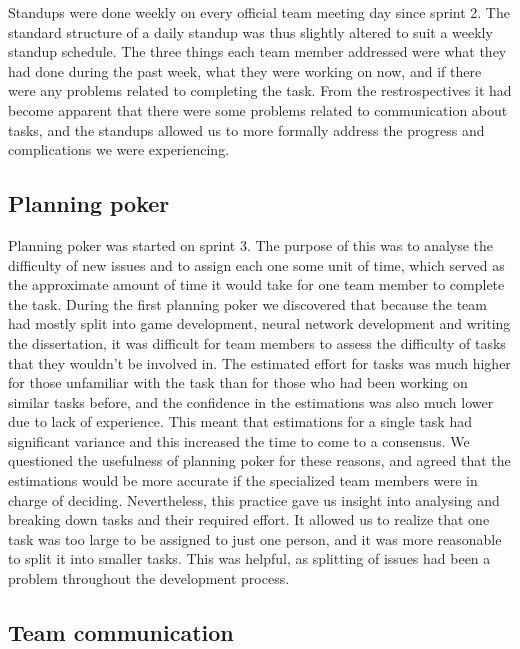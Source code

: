\documentclass{l3proj}
\begin{document}
Standups were done weekly on every official team meeting day since sprint 2. The standard structure of a daily standup was thus slightly altered to suit a weekly standup schedule. The three things each team member addressed were what they had done during the past week, what they were working on now, and if there were any problems related to completing the task. From the restrospectives it had become apparent that there were some problems related to communication about tasks, and the standups allowed us to more formally address the progress and complications we were experiencing. 

\subsection*{Planning poker}

Planning poker was started on sprint 3. The purpose of this was to analyse the difficulty of new issues and to assign each one some unit of time, which served as the approximate amount of time it would take for one team member to complete the task. During the first planning poker we discovered that because the team had mostly split into game development, neural network development and writing the dissertation, it was difficult for team members to assess the difficulty of tasks that they wouldn't be involved in. The estimated effort for tasks was much higher for those unfamiliar with the task than for those who had been working on similar tasks before, and the confidence in the estimations was also much lower due to lack of experience. This meant that estimations for a single task had significant variance and this increased the time to come to a consensus. We questioned the usefulness of planning poker for these reasons, and agreed that the estimations would be more accurate if the specialized team members were in charge of deciding. Nevertheless, this practice gave us insight into analysing and breaking down tasks and their required effort. It allowed us to realize that one task was too large to be assigned to just one person, and it was more reasonable to split it into smaller tasks. This was helpful, as splitting of issues had been a problem throughout the development process.

\subsection*{Team communication}



\end{document}
